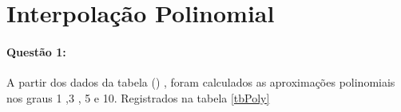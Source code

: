 \documentclass[a4paper,11pt]{article}
\title{\tituloCapa}
\begin{document}


\section{Interpolação Polinomial}
\paragraph{Questão 1:}A partir dos dados da tabela () , foram calculados as aproximações polinomiais nos graus 1 ,3 , 5  e 10. Registrados na tabela \ref{tbPoly}


{ \centering}




\end{document}
